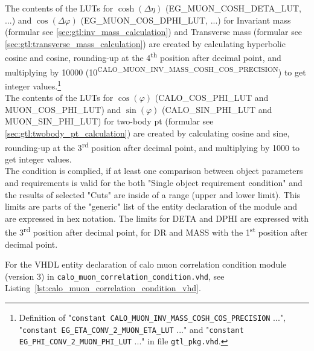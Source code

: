 The contents of the LUTs for $\cosh(\Delta\eta)$ (\small{EG\_MUON\_COSH\_DETA\_LUT}\normalsize, ...) and $\cos(\Delta\varphi)$ (\small{EG\_MUON\_COS\_DPHI\_LUT}\normalsize, ...) for Invariant mass
(formular see \ref{sec:gtl:inv_mass_calculation}) and Transverse mass (formular see \ref{sec:gtl:transverse_mass_calculation}) are created by calculating hyperbolic cosine and cosine, 
rounding-up at the 4\textsuperscript{th} position after decimal point, and multiplying by 10000
(10\textsuperscript{\tiny{CALO\_MUON\_INV\_MASS\_COSH\_COS\_PRECISION}}\normalsize) to get integer values.\footnote{Definition of "\texttt{constant \small{CALO\_MUON\_INV\_MASS\_COSH\_COS\_PRECISION}\normalsize} ...",
"\texttt{constant \small{EG\_ETA\_CONV\_2\_MUON\_ETA\_LUT}\normalsize} ..." and "\texttt{constant \small{EG\_PHI\_CONV\_2\_MUON\_PHI\_LUT}\normalsize} ..." in file \texttt{gtl\_pkg.vhd}.}\\
The contents of the LUTs for $\cos(\varphi)$ (\small{CALO\_COS\_PHI\_LUT and MUON\_COS\_PHI\_LUT}\normalsize) and $\sin(\varphi)$ (\small{CALO\_SIN\_PHI\_LUT and MUON\_SIN\_PHI\_LUT}\normalsize) for two-body pt 
(formular see \ref{sec:gtl:twobody_pt_calculation}) are created by calculating cosine and sine, rounding-up at the 3\textsuperscript{rd} position after decimal point,
and multiplying by 1000 to get integer values.\\
The condition is complied, if at least one comparison between object parameters and requirements is valid for the both "Single object requirement condition" and the results of selected "Cuts" are inside of
a range (upper and lower limit). This limits are parts of the "generic" list of the entity declaration of the module and are expressed in hex notation. The limits for DETA and DPHI
are expressed with the 3\textsuperscript{rd} position after decimal point, for DR and MASS with the 1\textsuperscript{st} position after decimal point.

For the VHDL entity declaration of calo muon correlation condition module (version 3) in \texttt{calo\_muon\_correlation\_condition.vhd}, see Listing~\ref{lst:calo_muon_correlation_condition_vhd}.\\
\clearpage


